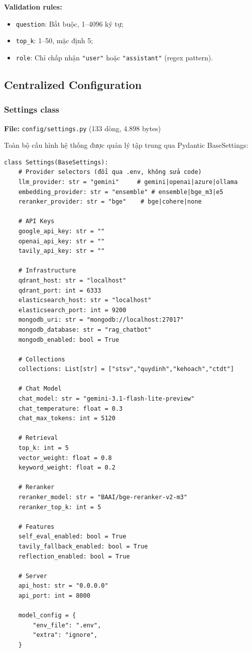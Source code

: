 \documentclass[../DoAn.tex]{subfiles}
\begin{document}
\textbf{Validation rules:}
\begin{itemize}
    \item \texttt{question}: Bắt buộc, 1--4096 ký tự;
    \item \texttt{top\_k}: 1--50, mặc định 5;
    \item \texttt{role}: Chỉ chấp nhận \texttt{"user"} hoặc \texttt{"assistant"} (regex pattern).
\end{itemize}

\subsection{Centralized Configuration}

\subsubsection{Settings class}
\textbf{File:} \texttt{config/settings.py} (133 dòng, 4.898 bytes)

Toàn bộ cấu hình hệ thống được quản lý tập trung qua Pydantic BaseSettings:
\begin{verbatim}
class Settings(BaseSettings):
    # Provider selectors (đổi qua .env, không sửa code)
    llm_provider: str = "gemini"     # gemini|openai|azure|ollama
    embedding_provider: str = "ensemble" # ensemble|bge_m3|e5
    reranker_provider: str = "bge"    # bge|cohere|none

    # API Keys
    google_api_key: str = ""
    openai_api_key: str = ""
    tavily_api_key: str = ""

    # Infrastructure
    qdrant_host: str = "localhost"
    qdrant_port: int = 6333
    elasticsearch_host: str = "localhost"
    elasticsearch_port: int = 9200
    mongodb_uri: str = "mongodb://localhost:27017"
    mongodb_database: str = "rag_chatbot"
    mongodb_enabled: bool = True

    # Collections
    collections: List[str] = ["stsv","quydinh","kehoach","ctdt"]

    # Chat Model
    chat_model: str = "gemini-3.1-flash-lite-preview"
    chat_temperature: float = 0.3
    chat_max_tokens: int = 5120

    # Retrieval
    top_k: int = 5
    vector_weight: float = 0.8
    keyword_weight: float = 0.2

    # Reranker
    reranker_model: str = "BAAI/bge-reranker-v2-m3"
    reranker_top_k: int = 5

    # Features
    self_eval_enabled: bool = True
    tavily_fallback_enabled: bool = True
    reflection_enabled: bool = True

    # Server
    api_host: str = "0.0.0.0"
    api_port: int = 8000

    model_config = {
        "env_file": ".env",
        "extra": "ignore",
    }
\end{verbatim}
\end{document}
